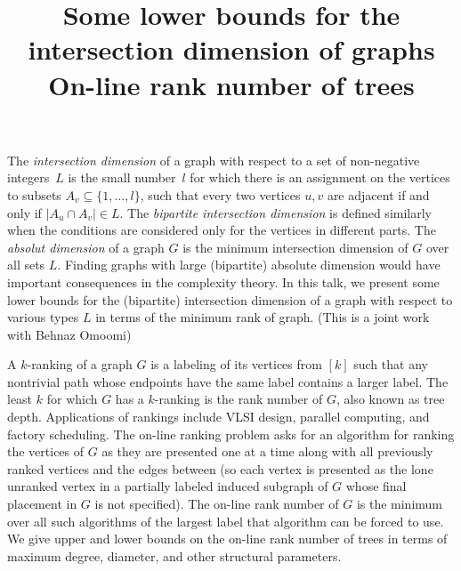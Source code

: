\documentclass{article}
\begin{document}
\vspace{.25in}

\title{Some lower bounds for the intersection dimension of graphs}
\endtitle
The {\it intersection dimension} of a graph with respect to a set
of non-negative integers~$L$ is the small number~$l$ for which there is an
assignment on the vertices to subsets $A_v \subseteq \{1,\dots, l\}$, such
that every two vertices $u,v$ are adjacent if and only if $|A_u \cap A_v|\in
L$.
The {\it bipartite intersection dimension} is defined similarly when the
conditions are considered only for the vertices in different parts. The {\it
absolut dimension} of a graph $G$ is the minimum intersection dimension of
$G$ over all sets $L$. Finding graphs with large (bipartite) absolute
dimension would have important consequences in the complexity theory.
In this talk, we present some lower bounds for the (bipartite) intersection
dimension of a graph with respect to various types $L$ in terms of the
minimum rank of graph.
(This is a joint work with Behnaz Omoomi)




\vspace{.25in}

\title{ On-line rank number of trees}
\endtitle
A $k$-ranking of a graph $G$ is a labeling of its vertices from $[k]$ such that any nontrivial path whose endpoints have the same label contains a larger label.  The least $k$ for which $G$ has a $k$-ranking is the rank number of $G$, also known as tree depth.  Applications of rankings include VLSI design, parallel computing, and factory scheduling. The on-line ranking problem asks for an algorithm for ranking the vertices of $G$ as they are presented one at a time along with all previously ranked vertices and the edges between (so each vertex is presented as the lone unranked vertex in a partially labeled induced subgraph of $G$ whose final placement in $G$ is not specified).  The on-line rank number of $G$ is the minimum over all such algorithms of the largest label that algorithm can be forced to use.  We give upper and lower bounds on the on-line rank number of trees in terms of maximum degree, diameter, and other structural parameters.
\end{document}
